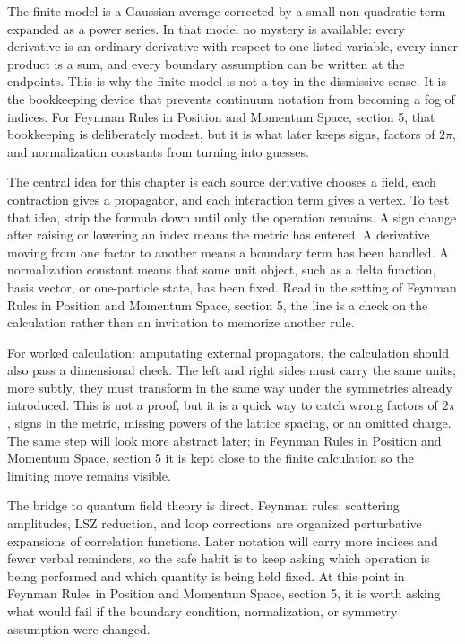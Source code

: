 The finite model is a Gaussian average corrected by a small non-quadratic term expanded as a power series.  In that model no mystery is available: every derivative is an ordinary derivative with respect to one listed variable, every inner product is a sum, and every boundary assumption can be written at the endpoints.  This is why the finite model is not a toy in the dismissive sense.  It is the bookkeeping device that prevents continuum notation from becoming a fog of indices.  For Feynman Rules in Position and Momentum Space, section 5, that bookkeeping is deliberately modest, but it is what later keeps signs, factors of \(2\pi\), and normalization constants from turning into guesses.

The central idea for this chapter is each source derivative chooses a field, each contraction gives a propagator, and each interaction term gives a vertex.  To test that idea, strip the formula down until only the operation remains.  A sign change after raising or lowering an index means the metric has entered.  A derivative moving from one factor to another means a boundary term has been handled.  A normalization constant means that some unit object, such as a delta function, basis vector, or one-particle state, has been fixed.  Read in the setting of Feynman Rules in Position and Momentum Space, section 5, the line is a check on the calculation rather than an invitation to memorize another rule.

For worked calculation: amputating external propagators, the calculation should also pass a dimensional check.  The left and right sides must carry the same units; more subtly, they must transform in the same way under the symmetries already introduced.  This is not a proof, but it is a quick way to catch wrong factors of \(2\pi\), signs in the metric, missing powers of the lattice spacing, or an omitted charge.  The same step will look more abstract later; in Feynman Rules in Position and Momentum Space, section 5 it is kept close to the finite calculation so the limiting move remains visible.

The bridge to quantum field theory is direct.  Feynman rules, scattering amplitudes, LSZ reduction, and loop corrections are organized perturbative expansions of correlation functions.  Later notation will carry more indices and fewer verbal reminders, so the safe habit is to keep asking which operation is being performed and which quantity is being held fixed.  At this point in Feynman Rules in Position and Momentum Space, section 5, it is worth asking what would fail if the boundary condition, normalization, or symmetry assumption were changed.

